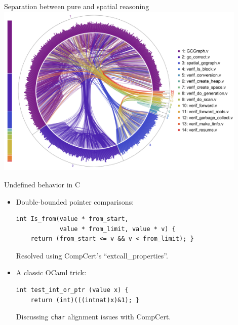 \documentclass[professionalfonts, xcolor=table]{beamer}
\begin{document}
\begin{frame}{Separation between pure and spatial reasoning}
  \centering
  \includegraphics[width=0.9\textwidth]{certigc_theorems.pdf}
\end{frame}

\begin{frame}[fragile]{Undefined behavior in C}

  \begin{itemize}
  \item Double-bounded pointer comparisons:
    \begin{Verbatim}
int Is_from(value * from_start,
            value * from_limit, value * v) {
    return (from_start <= v && v < from_limit); }
    \end{Verbatim}
    Resolved using CompCert's ``extcall\_properties''.
    \pause
  \item A classic OCaml trick:
    \begin{Verbatim}
int test_int_or_ptr (value x) {
    return (int)(((intnat)x)&1); }
    \end{Verbatim}
    Discussing \texttt{char} alignment issues with CompCert.
  \end{itemize}
\end{frame}
\end{document}
